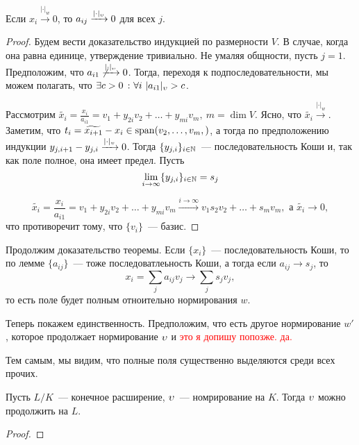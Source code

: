  	\begin{lemma} 
 		Если $x_i \xrightarrow{|\cdot|_{w}} 0$, то $a_{i j} \xrightarrow{|\cdot|_{\upsilon}} 0$ для всех $j$. 
 	\end{lemma}
 	\begin{proof}
 		Будем вести доказательство индукцией по размерности $V$. В случае, когда она равна единице, утверждение тривиально. Не умаляя общности, пусть $j = 1$. Предположим, что $a_{i 1} \not\xrightarrow{|\cdot|_{\upsilon}} 0$. Тогда, переходя к подпоследовательности, мы можем полагать, что $\exists c > 0 \ \colon \forall i \ |a_{i 1}|_{\upsilon} > c$.

 		Рассмотрим $\widetilde{x_i} = \frac{x_i}{a_{i 1}} = v_1 + y_{2i} v_2 + \ldots + y_{mi} v_m, \ m = \dim{V}$. Ясно, что $\widetilde{x_i} \xrightarrow{|\cdot|_{w}}$. Заметим, что $t_i = \widetilde{x_{i + 1}} - x_{i} \in \Span\lr*{v_2, \ldots, v_{m},}$, а тогда по предположению индукции $y_{j,i+ 1} - y_{j, i} \xrightarrow{|\cdot|_{\upsilon}} 0$. Тогда $\{ y_{j, i} \}_{i \in \mathbb{N}}$~--- последовательность Коши и, так как поле полное, она имеет предел. Пусть 
 		\[
 			\lim_{i \to \infty} \{ y_{j, i} \}_{i \in \mathbb{N}} = s_{j}
 		\]

 		\[
 			\widetilde{x_i} = \frac{x_i}{a_{i 1}} = v_1 + y_{2i} v_2 + \ldots + y_{mi} v_m \xrightarrow{i \to \infty} v_1 s_2 v_2 + \ldots + s_m v_m, \text{ а } \widetilde{x_i} \to 0,
 		\]
 		что противоречит тому, что $\{ v_i \}$~--- базис. 

 	\end{proof}

 	Продолжим доказательство теоремы. Если $\{ x_i \}$~--- последовательность Коши, то по лемме $\{ a_{i j} \}$~--- тоже последоватлеьность Коши, а тогда если $a_{i j} \to s_{j}$, то 
 	\[
 		x_i = \sum_{j} a_{i j} v_{j} \to \sum_{j} s_j v_j,
 	\]
 	то есть поле будет полным отноительно нормирования $w$. 

 	Теперь покажем единственность. Предположим, что есть другое нормирование $w'$, которое продолжает нормирование $\upsilon$ и \textcolor{red}{это я допишу попозже. да. }

 	Тем самым, мы видим, что полные поля существенно выделяются среди всех прочих. 


 	\begin{theorem} 
 		Пусть $L/K$~--- конечное расширение, $\upsilon$~--- номрирование на $K$. Тогда $\upsilon$ можно продолжить на $L$.
 	\end{theorem}

 	\begin{proof}
 		
 	\end{proof}

